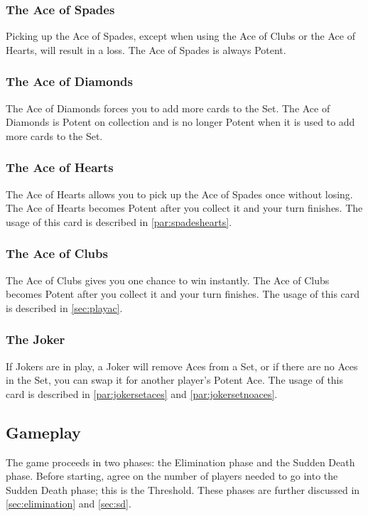\documentclass{article}
\begin{document}
\subsubsection{The Ace of Spades \label{sec:acespades}}
Picking up the Ace of Spades, except when using the Ace of Clubs or the
Ace of Hearts, will result in a loss. The Ace of Spades is always Potent.

\subsubsection{The Ace of Diamonds \label{sec:acediamonds}}
The Ace of Diamonds forces you to add more cards to the Set. The Ace of
Diamonds is Potent on collection and is no longer Potent when it is used
to add more cards to the Set.

\subsubsection{The Ace of Hearts \label{sec:acehearts}}
The Ace of Hearts allows you to pick up the Ace of Spades once without
losing. The Ace of Hearts becomes Potent after you collect it and your
turn finishes. The usage of this card is described in
\autoref{par:spadeshearts}.

\subsubsection{The Ace of Clubs \label{sec:aceclubs}}
The Ace of Clubs gives you one chance to win instantly. The Ace of Clubs
becomes Potent after you collect it and your turn finishes. The usage of
this card is described in \autoref{sec:playac}.

\subsubsection{The Joker \label{sec:joker}}
If Jokers are in play, a Joker will remove Aces from a Set, or if there
are no Aces in the Set, you can swap it for another player's Potent
Ace. The usage of this card is described in \autoref{par:jokersetaces} and
\autoref{par:jokersetnoaces}.

\subsection{Gameplay \label{sec:gameplay}}

The game proceeds in two phases: the Elimination phase and the Sudden
Death phase. Before starting, agree on the number of players needed to
go into the Sudden Death phase; this is the Threshold. These phases are
further discussed in \autoref{sec:elimination} and \autoref{sec:sd}.
\end{document}
